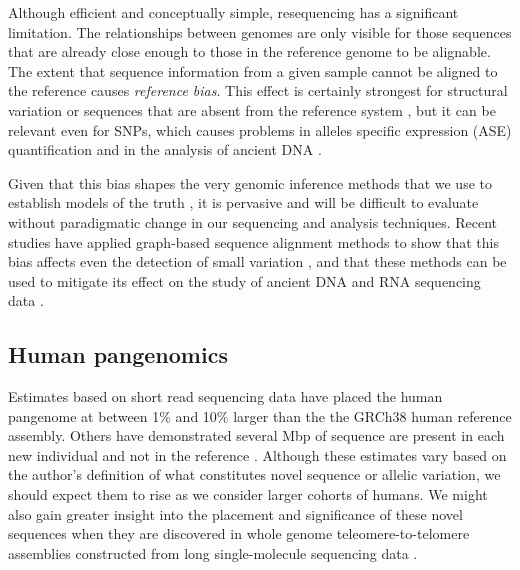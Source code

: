 Although efficient and conceptually simple, resequencing has a significant limitation.
The relationships between genomes are only visible for those sequences that are already close enough to those in the reference genome to be alignable.
The extent that sequence information from a given sample cannot be aligned to the reference causes \emph{reference bias}.
This effect is certainly strongest for structural variation or sequences that are absent from the reference system \cite{sudmant2015integrated}, but it can be relevant even for SNPs, which causes problems in alleles specific expression (ASE) quantification \cite{stevenson2013sources} and in the analysis of ancient DNA \cite{zhou2017antcaller}.

Given that this bias shapes the very genomic inference methods that we use to establish models of the truth \cite{zook2014integrating}, it is pervasive and will be difficult to evaluate without paradigmatic change in our sequencing and analysis techniques.
Recent studies have applied graph-based sequence alignment methods to show that this bias affects even the detection of small variation \cite{eggertsson2017graphtyper,Garrison_2018}, and that these methods can be used to mitigate its effect on the study of ancient DNA \cite{martiniano2019removing} and RNA sequencing data \cite{Kim_2019}.

\subsection{Human pangenomics}

Estimates based on short read sequencing data have placed the human pangenome at between 1\% \cite{li2010building} and 10\% \cite{sherman2019assembly} larger than the the GRCh38 human reference assembly.
Others have demonstrated several Mbp of sequence are present in each new individual and not in the reference \cite{li2010building,Steinberg_2016,Audano_2019}.
Although these estimates vary based on the author's definition of what constitutes novel sequence or allelic variation, we should expect them to rise as we consider larger cohorts of humans.
We might also gain greater insight into the placement and significance of these novel sequences when they are discovered in whole genome teleomere-to-telomere assemblies constructed from long single-molecule sequencing data \cite{miga2019telomere,Langley_2019}.

